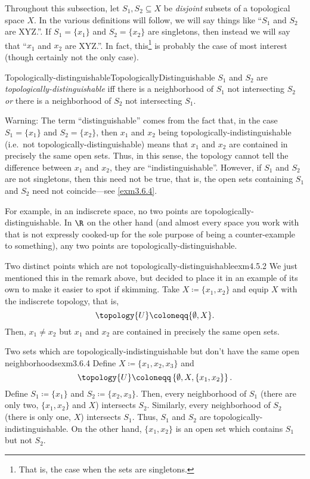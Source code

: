 Throughout this subsection, let $S_1,S_2\subseteq X$ be \emph{disjoint} subsets of a topological space $X$.  In the various definitions will follow, we will say things like ``$S_1$ and $S_2$ are XYZ.''.  If $S_1=\{ x_1\}$ and $S_2=\{ x_2\}$ are singletons, then instead we will say that ``$x_1$ and $x_2$ are XYZ.''.  In fact, this\footnote{That is, the case when the sets are singletons.} is probably the case of most interest (though certainly not the only case).
\begin{dfn}{Topologically-distinguishable\hfill}{TopologicallyDistinguishable}
$S_1$ and $S_2$ are \emph{topologically-distinguishable} iff there is a neighborhood of $S_1$ not intersecting $S_2$ \emph{or} there is a neighborhood of $S_2$ not intersecting $S_1$.
\begin{wrn}
Warning:  The term ``distinguishable'' comes from the fact that, in the case $S_1=\{ x_1\}$ and $S_2=\{ x_2\}$, then $x_1$ and $x_2$ being topologically-indistinguishable (i.e.~not topologically-distinguishable) means that $x_1$ and $x_2$ are contained in precisely the same open sets.  Thus, in this sense, the topology cannot tell the difference between $x_1$ and $x_2$, they are ``indistinguishable''.  However, if $S_1$ and $S_2$ are not singletons, then this need not be true, that is, the open sets containing $S_1$ and $S_2$ need not coincide---see \cref{exm3.6.4}.
\end{wrn}
\begin{rmk}
For example, in an indiscrete space, no two points are topologically-distinguishable.  In $\R$ on the other hand (and almost every space you work with that is not expressly cooked-up for the sole purpose of being a counter-example to something), any two points are topologically-distinguishable.
\end{rmk}
\end{dfn}
\begin{exm}{Two distinct points which are not top\-ologically-distinguishable}{exm4.5.2}
We just mentioned this in the remark above, but decided to place it in an example of its own to make it easier to spot if skimming.  Take $X\coloneqq \{ x_1,x_2\}$ and equip $X$ with the indiscrete topology, that is,
\begin{equation}
\topology{U}\coloneqq \{ \emptyset ,X\} .
\end{equation}
Then, $x_1\neq x_2$ but $x_1$ and $x_2$ are contained in precisely the same open sets.
\end{exm}
\begin{exm}{Two sets which are topo\-logically-indistinguish\-able but don't have the same open neighborhoods}{exm3.6.4}
Define $X\coloneqq \{ x_1,x_2,x_3\}$ and
\begin{equation}
\topology{U}\coloneqq \left\{ \emptyset ,X,\{ x_1,x_2\} \right\} .
\end{equation}
Define $S_1\coloneqq \{ x_1\}$ and $S_2\coloneqq \{ x_2,x_3\}$.  Then, every neighborhood of $S_1$ (there are only two, $\{ x_1,x_2\}$ and $X$) intersects $S_2$.  Similarly, every neighborhood of $S_2$ (there is only one, $X$) intersects $S_1$.  Thus, $S_1$ and $S_2$ are topologically-indistinguishable.  On the other hand, $\{ x_1,x_2\}$ is an open set which contains $S_1$ but not $S_2$.
\end{exm}

